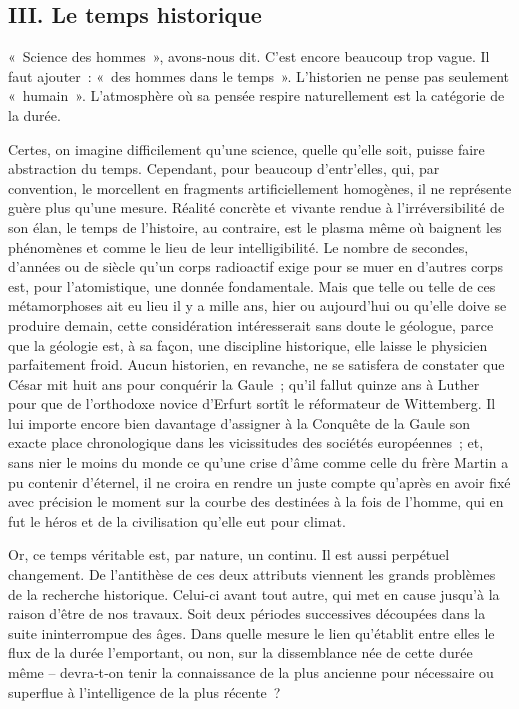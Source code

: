 \documentclass[french,twoside]{book} %
\begin{document}
\subsection[{III. Le temps historique}]{III. Le temps historique}
\noindent « Science des hommes », avons‑nous dit. C’est encore beaucoup trop vague. Il faut ajouter : « des hommes dans le temps ». L’historien ne pense  
\label{p5} pas seulement « humain ». L’atmosphère où sa pensée respire naturelle­ment est la catégorie de la durée.\par
Certes, on imagine difficilement qu’une science, quelle qu’elle soit, puisse faire abstraction du temps. Cependant, pour beaucoup d’entr’elles, qui, par convention, le morcellent en fragments artificiellement homogènes, il ne représente guère plus qu’une mesure. Réalité concrète et vivante rendue à l’irréversibilité de son élan, le temps de l’histoire, au contraire, est le plasma même où baignent les phénomènes et comme le lieu de leur intelligibilité. Le nombre de secondes, d’années ou de siècle qu’un corps radioactif exige pour se muer en d’autres corps est, pour l’atomistique, une donnée fondamentale. Mais que telle ou telle de ces métamorphoses ait eu lieu il y a mille ans, hier ou aujourd’hui ou qu’elle doive se produire demain, cette considération intéresserait sans doute le géologue, parce que la géologie est, à sa façon, une discipline historique, elle laisse le physicien parfaitement froid. Aucun historien, en revanche, ne se satisfera de constater que César mit huit ans pour conquérir la Gaule ; qu’il fallut quinze ans à Luther pour que de l’orthodoxe novice d’Erfurt sortît le réformateur de Wittemberg. Il lui importe encore bien davantage d’assigner à la Conquête de la Gaule son exacte place chrono­logique dans les vicissitudes des sociétés européennes ; et, sans nier le moins du monde ce qu’une crise d’âme comme celle du frère Martin a pu contenir d’éternel, il ne croira en rendre un juste compte qu’après en avoir fixé avec précision le moment sur la courbe des destinées à la fois de l’homme, qui en fut le héros et de la civilisation qu’elle eut pour climat.\par
Or, ce temps véritable est, par nature, un continu. Il est aussi per­pétuel changement. De l’antithèse de ces deux attributs viennent les grands problèmes de la recherche historique. Celui-ci avant tout autre, qui met en cause jusqu’à la raison d’être de nos travaux. Soit deux périodes successives découpées dans la suite ininterrompue des âges. Dans quelle mesure le lien qu’établit entre elles le flux de la durée l’emportant, ou non, sur la dissemblance née de cette durée même – devra‑t‑on tenir la connaissance de la plus ancienne pour nécessaire ou superflue à l’intel­ligence de la plus récente ?
\end{document}
